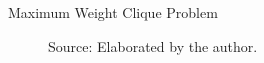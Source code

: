 \documentclass{beamer}
\newcommand{\Pp}{\mathscr{P}}
\newcommand{\source}[1]{\caption*{Source: {#1}} }
\begin{document}
\begin{frame}{Maximum Weight Clique Problem}
\begin{figure}
		\source{Elaborated by the author.}
	\end{figure}
\end{frame}

		
		
		
\end{document}
